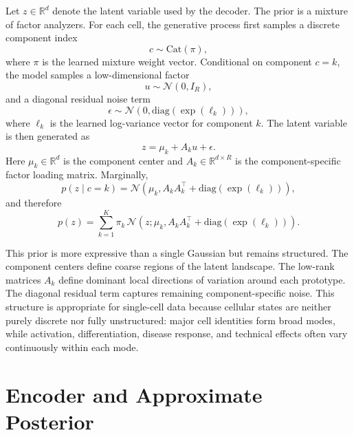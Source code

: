 \documentclass[11pt]{article}
\begin{document}
Let $z \in \mathbb{R}^d$ denote the latent variable used by the decoder. The prior is a mixture of factor analyzers. For each cell, the generative process first samples a discrete component index
\begin{equation}
    c \sim \mathrm{Cat}(\pi),
\end{equation}
where $\pi$ is the learned mixture weight vector. Conditional on component $c=k$, the model samples a low-dimensional factor
\begin{equation}
    u \sim \mathcal{N}(0, I_R),
\end{equation}
and a diagonal residual noise term
\begin{equation}
    \epsilon \sim \mathcal{N}\left(0, \mathrm{diag}\left(\exp(\ell_k)\right)\right),
\end{equation}
where $\ell_k$ is the learned log-variance vector for component $k$. The latent variable is then generated as
\begin{equation}
    z = \mu_k + A_k u + \epsilon.
\end{equation}
Here $\mu_k \in \mathbb{R}^d$ is the component center and $A_k \in \mathbb{R}^{d \times R}$ is the component-specific factor loading matrix. Marginally,
\begin{equation}
    p(z \mid c=k) = \mathcal{N}\left(\mu_k, A_k A_k^\top + \mathrm{diag}\left(\exp(\ell_k)\right)\right),
\end{equation}
and therefore
\begin{equation}
    p(z) = \sum_{k=1}^{K} \pi_k \, \mathcal{N}\left(z; \mu_k, A_k A_k^\top + \mathrm{diag}\left(\exp(\ell_k)\right)\right).
\end{equation}

This prior is more expressive than a single Gaussian but remains structured. The component centers define coarse regions of the latent landscape. The low-rank matrices $A_k$ define dominant local directions of variation around each prototype. The diagonal residual term captures remaining component-specific noise. This structure is appropriate for single-cell data because cellular states are neither purely discrete nor fully unstructured: major cell identities form broad modes, while activation, differentiation, disease response, and technical effects often vary continuously within each mode.

\section{Encoder and Approximate Posterior}
\end{document}
